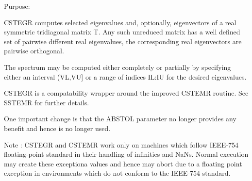  \begin{DoxyParagraph}{Purpose\+: }
\begin{DoxyVerb} CSTEGR computes selected eigenvalues and, optionally, eigenvectors
 of a real symmetric tridiagonal matrix T. Any such unreduced matrix has
 a well defined set of pairwise different real eigenvalues, the corresponding
 real eigenvectors are pairwise orthogonal.

 The spectrum may be computed either completely or partially by specifying
 either an interval (VL,VU] or a range of indices IL:IU for the desired
 eigenvalues.

 CSTEGR is a compatability wrapper around the improved CSTEMR routine.
 See SSTEMR for further details.

 One important change is that the ABSTOL parameter no longer provides any
 benefit and hence is no longer used.

 Note : CSTEGR and CSTEMR work only on machines which follow
 IEEE-754 floating-point standard in their handling of infinities and
 NaNs.  Normal execution may create these exceptiona values and hence
 may abort due to a floating point exception in environments which
 do not conform to the IEEE-754 standard.\end{DoxyVerb}
 
\end{DoxyParagraph}

